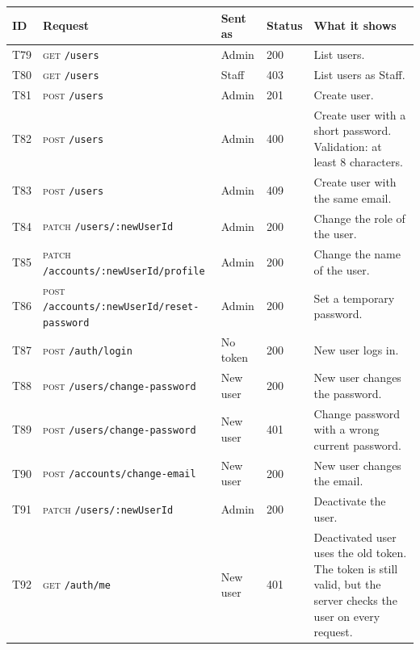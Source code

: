 \documentclass[11pt,a4paper]{article}
\newcommand{\code}[1]{\texttt{#1}}
\begin{document}
\begin{longtable}{@{}P{0.7cm}P{5.0cm}P{1.3cm}P{1.15cm}P{5.75cm}@{}}
\toprule
\textbf{ID} & \textbf{Request} & \textbf{Sent as} & \textbf{Status} & \textbf{What it shows} \\
\midrule
\endhead
T79 & \textsc{get} \code{/\allowbreak{}users} & Admin & 200 & List users. \\
T80 & \textsc{get} \code{/\allowbreak{}users} & Staff & 403 & List users as Staff. \\
T81 & \textsc{post} \code{/\allowbreak{}users} & Admin & 201 & Create user. \\
T82 & \textsc{post} \code{/\allowbreak{}users} & Admin & 400 & Create user with a short password. Validation: at least 8 characters. \\
T83 & \textsc{post} \code{/\allowbreak{}users} & Admin & 409 & Create user with the same email. \\
T84 & \textsc{patch} \code{/\allowbreak{}users/\allowbreak{}:newUserId} & Admin & 200 & Change the role of the user. \\
T85 & \textsc{patch} \code{/\allowbreak{}accounts/\allowbreak{}:newUserId/\allowbreak{}profile} & Admin & 200 & Change the name of the user. \\
T86 & \textsc{post} \code{/\allowbreak{}accounts/\allowbreak{}:newUserId/\allowbreak{}reset-password} & Admin & 200 & Set a temporary password. \\
T87 & \textsc{post} \code{/\allowbreak{}auth/\allowbreak{}login} & No token & 200 & New user logs in. \\
T88 & \textsc{post} \code{/\allowbreak{}users/\allowbreak{}change-password} & New user & 200 & New user changes the password. \\
T89 & \textsc{post} \code{/\allowbreak{}users/\allowbreak{}change-password} & New user & 401 & Change password with a wrong current password. \\
T90 & \textsc{post} \code{/\allowbreak{}accounts/\allowbreak{}change-email} & New user & 200 & New user changes the email. \\
T91 & \textsc{patch} \code{/\allowbreak{}users/\allowbreak{}:newUserId} & Admin & 200 & Deactivate the user. \\
T92 & \textsc{get} \code{/\allowbreak{}auth/\allowbreak{}me} & New user & 401 & Deactivated user uses the old token. The token is still valid, but the server checks the user on every request. \\
\bottomrule
\end{longtable}
\end{document}
